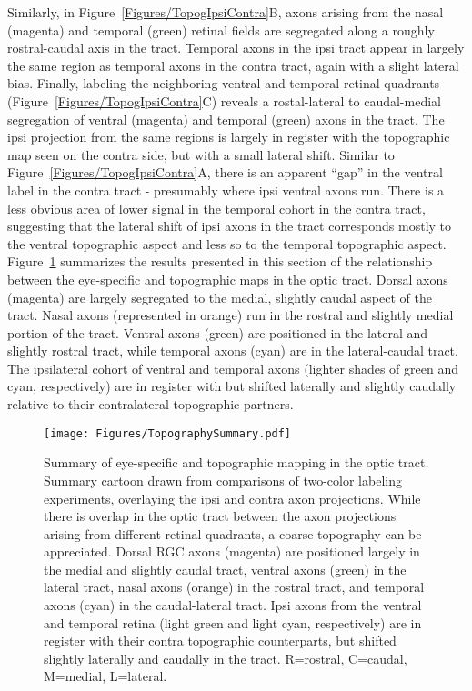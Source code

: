 Similarly, in Figure~\ref{Figures/TopogIpsiContra}B, axons arising from the nasal (magenta) and temporal (green) retinal fields are segregated along a roughly rostral-caudal axis in the tract.
Temporal axons in the ipsi tract appear in largely the same region as temporal axons in the contra tract, again with a slight lateral bias.
Finally, labeling the neighboring ventral and temporal retinal quadrants (Figure~\ref{Figures/TopogIpsiContra}C) reveals a rostal-lateral to caudal-medial segregation of ventral (magenta) and temporal (green) axons in the tract.
The ipsi projection from the same regions is largely in register with the topographic map seen on the contra side, but with a small lateral shift.
Similar to Figure~\ref{Figures/TopogIpsiContra}A, there is an apparent ``gap'' in the ventral label in the contra tract - presumably where ipsi ventral axons run.
There is a less obvious area of lower signal in the temporal cohort in the contra tract, suggesting that the lateral shift of ipsi axons in the tract corresponds mostly to the ventral topographic aspect and less so to the temporal topographic aspect.
Figure~\ref{Figures/TopographySummary} summarizes the results presented in this section of the relationship between the eye-specific and topographic maps in the optic tract.
Dorsal axons (magenta) are largely segregated to the medial, slightly caudal aspect of the tract.
Nasal axons (represented in orange) run in the rostral and slightly medial portion of the tract.
Ventral axons (green) are positioned in the lateral and slightly rostral tract, while temporal axons (cyan) are in the lateral-caudal tract.
The ipsilateral cohort of ventral and temporal axons (lighter shades of green and cyan, respectively) are in register with but shifted laterally and slightly caudally relative to their contralateral topographic partners.
\begin{figure}[hbtp]
    \begin{center}
        \texttt{[image: Figures/TopographySummary.pdf]}
        \caption[Summary of eye-specific and topographic mapping in the optic tract.]
        {Summary of eye-specific and topographic mapping in the optic tract.
        Summary cartoon drawn from comparisons of two-color labeling experiments, overlaying the ipsi and contra axon projections.
        While there is overlap in the optic tract between the axon projections arising from different retinal quadrants, a coarse topography can be appreciated.
        Dorsal RGC axons (magenta) are positioned largely in the medial and slightly caudal tract, ventral axons (green) in the lateral tract, nasal axons (orange) in the rostral tract, and temporal axons (cyan) in the caudal-lateral tract.
        Ipsi axons from the ventral and temporal retina (light green and light cyan, respectively) are in register with their contra topographic counterparts, but shifted slightly laterally and caudally in the tract.
        R=rostral, C=caudal, M=medial, L=lateral.}
        \label{Figures/TopographySummary}
    \end{center}
\end{figure}
